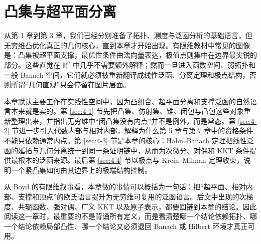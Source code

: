 \chapter{凸集与超平面分离}

\label{chap:04}

从第 1 章到第 3 章，我们已经分别准备了拓扑、测度与泛函分析的基础语言，但无穷维凸优化真正的几何核心，直到本章才开始出现。有限维教材中常见的图像是：凸集被超平面支撑，最优性条件由法向量表达，极值点则集中在边界最尖锐的部分。这些直觉在 $\mathbb R^n$ 中几乎不需要额外解释；然而一旦进入函数空间、弱拓扑和一般 Banach 空间，它们就必须被重新翻译成线性泛函、分离定理和极点结构，否则所谓“几何直观”只会停留在图片层面。

本章默认主要工作在实线性空间中，因为凸组合、超平面分离和支撑泛函的自然语言本来就是实的。第 \ref{sec:4-1} 节先把凸集、仿射集、锥、闭包与凸包这些对象重新整理出来，并指出无穷维中“闭凸集没有内点”并不是例外，而是常态。第 \ref{sec:4-2} 节进一步引入代数内部与相对内部，解释为什么第 5 章与第 7 章中的资格条件不能只依赖通常内点。第 \ref{sec:4-3} 节是本章的核心：Hahn--Banach 定理把线性泛函的延拓与几何分离统一到同一条证明链中，从而为次微分、对偶和 KKT 条件提供最根本的泛函来源。最后第 \ref{sec:4-4} 节以极点与 Krein--Milman 定理收束，说明一个紧凸集如何由其边界上的极端结构控制。

从 Boyd 的有限维叙事看，本章做的事情可以概括为一句话：把“超平面、相对内部、支撑和顶点”的欧氏语言提升为无穷维可复用的泛函语言。后文中出现的次梯度、共轭函数、强对偶、广义 KKT 以及原子表示，都要回链到本章的结论。因此阅读这一章时，最重要的不是背诵所有定义，而是看清楚哪一个结论依赖拓扑、哪一个结论依赖局部凸性、哪一个结论又必须退回 Banach 或 Hilbert 环境才真正可用。








